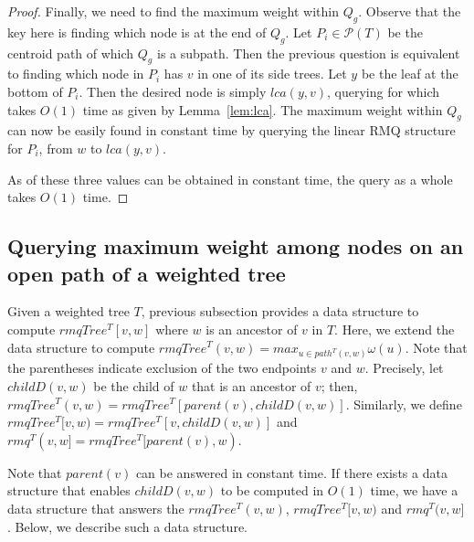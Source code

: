 \documentclass[final,1p,times]{elsarticle}
\newcommand{\weight}{\omega}
\begin{document}
\begin{proof}
            Finally, we need to find the maximum weight within $Q_g$. Observe that the key here is finding which node is at the end of $Q_g$. Let $P_i \in \mathcal{P}(T)$ be the centroid path of which $Q_g$ is a subpath. Then the previous question is equivalent to finding which node in $P_i$ has $v$ in one of its side trees. Let $y$ be the leaf at the bottom of $P_i$. Then the desired node is simply $lca(y, v)$, querying for which takes $O(1)$ time as given by Lemma~\ref{lem:lca}. The maximum weight within $Q_g$ can now be easily found in constant time by querying the linear RMQ structure for $P_i$, from $w$ to $lca(y, v)$.

            As of these three values can be obtained in constant time, the query as a whole takes $O(1)$ time.
        \end{proof}

    \subsection{Querying maximum weight among nodes on an open path of a weighted tree}
    \label{subsec:cfd}

    Given a weighted tree $T$, previous subsection provides a data structure to compute $rmqTree^T[v, w]$ where $w$ is an ancestor of $v$ in $T$. Here, we extend the data structure to compute $rmqTree^T(v, w) = max_{u \in path^T(v, w)} \weight(u)$. Note that the parentheses indicate exclusion of the two endpoints $v$ and $w$. Precisely, let $childD(v, w)$ be the child of $w$ that is an ancestor of $v$; then, $rmqTree^T(v, w) = rmqTree^T[parent(v), childD(v,w)]$.
    Similarly, we define $rmqTree^T[v, w) = rmqTree^T[v, childD(v,w)]$ and $rmq^T(v, w] = rmqTree^T[parent(v), w)$.

    Note that $parent(v)$ can be answered in constant time. If there exists a data structure that enables $childD(v,w)$ to be computed in $O(1)$ time, we have a data structure that answers the $rmqTree^T(v, w)$,  $rmqTree^T[v, w)$ and $rmq^T(v, w]$. Below, we describe such a data structure.

\end{document}
